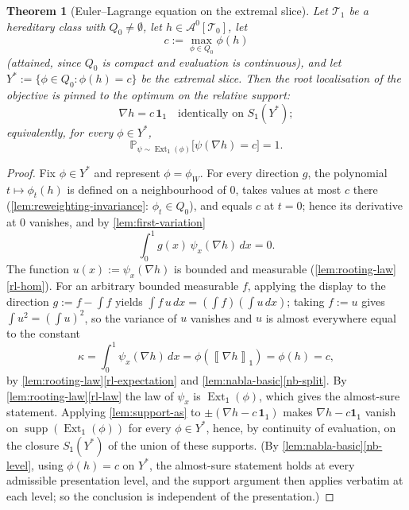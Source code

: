 \documentclass[11pt]{article}
\newtheorem{theorem}{Theorem}
\theoremstyle{definition}
\newcommand{\Prob}{\mathbb{P}}
\newcommand{\A}{\mathcal{A}}
\newcommand{\T}{\mathcal{T}}
\newcommand{\Ext}{\operatorname{Ext}}
\newcommand{\supp}{\operatorname{supp}}
\newcommand{\avg}[2]{\left\llbracket #1 \right\rrbracket_{#2}}
\newcommand{\one}{\mathbf 1}
\newcommand{\vtype}{\mathsf{1}}
\begin{document}
\begin{theorem}[Euler--Lagrange equation on the extremal slice]\label{thm:ensemble-EL}
Let $\T_1$ be a hereditary class with $Q_0\neq\emptyset$, let $h\in\A^0[\T_0]$, let
\[
  c:=\max_{\phi\in Q_0}\phi(h)
\]
(attained, since $Q_0$ is compact and evaluation is continuous), and let
$Y^\ast:=\{\phi\in Q_0:\phi(h)=c\}$ be the extremal slice.  Then the root localisation
of the objective is pinned to the optimum on the relative support:
\[
  \nabla h=c\,\one_{\vtype}
  \quad\text{identically on }S_{\vtype}(Y^\ast);
\]
equivalently, for every $\phi\in Y^\ast$,
\[
  \Prob_{\psi\sim\Ext_{\vtype}(\phi)}\bigl[\psi(\nabla h)=c\bigr]=1 .
\]
\end{theorem}

\begin{proof}
Fix $\phi\in Y^\ast$ and represent $\phi=\phi_W$.  For every direction $g$, the
polynomial $t\mapsto\phi_t(h)$ is defined on a neighbourhood of $0$, takes values at
most $c$ there (\cref{lem:reweighting-invariance}: $\phi_t\in Q_0$), and equals $c$ at
$t=0$; hence its derivative at $0$ vanishes, and by \cref{lem:first-variation}
\[
  \int_0^1 g(x)\,\psi_x(\nabla h)\,dx=0 .
\]
The function $u(x):=\psi_x(\nabla h)$ is bounded and measurable
(\cref{lem:rooting-law}\ref{rl-hom}).  For an arbitrary bounded measurable $f$,
applying the display to the direction $g:=f-\int f$ yields
$\int f\,u\,dx=(\int f)(\int u\,dx)$; taking $f:=u$ gives $\int u^2=(\int u)^2$, so
the variance of $u$ vanishes and $u$ is almost everywhere equal to the constant
\[
  \kappa=\int_0^1\psi_x(\nabla h)\,dx
  =\phi(\avg{\nabla h}{\vtype})
  =\phi(h)=c,
\]
by \cref{lem:rooting-law}\ref{rl-expectation} and
\cref{lem:nabla-basic}\ref{nb-split}.  By \cref{lem:rooting-law}\ref{rl-law} the law of
$\psi_x$ is $\Ext_{\vtype}(\phi)$, which gives the almost-sure statement.  Applying
\cref{lem:support-as} to $\pm(\nabla h-c\,\one_{\vtype})$ makes $\nabla h-c\one_\vtype$
vanish on $\supp(\Ext_{\vtype}(\phi))$ for every $\phi\in Y^\ast$, hence, by continuity
of evaluation, on the closure $S_{\vtype}(Y^\ast)$ of the union of these supports.
(By \cref{lem:nabla-basic}\ref{nb-level}, using $\phi(h)=c$ on $Y^\ast$, the
almost-sure statement holds at every admissible presentation level, and the support
argument then applies verbatim at each level; so the conclusion is independent of the
presentation.)
\end{proof}
\end{document}
